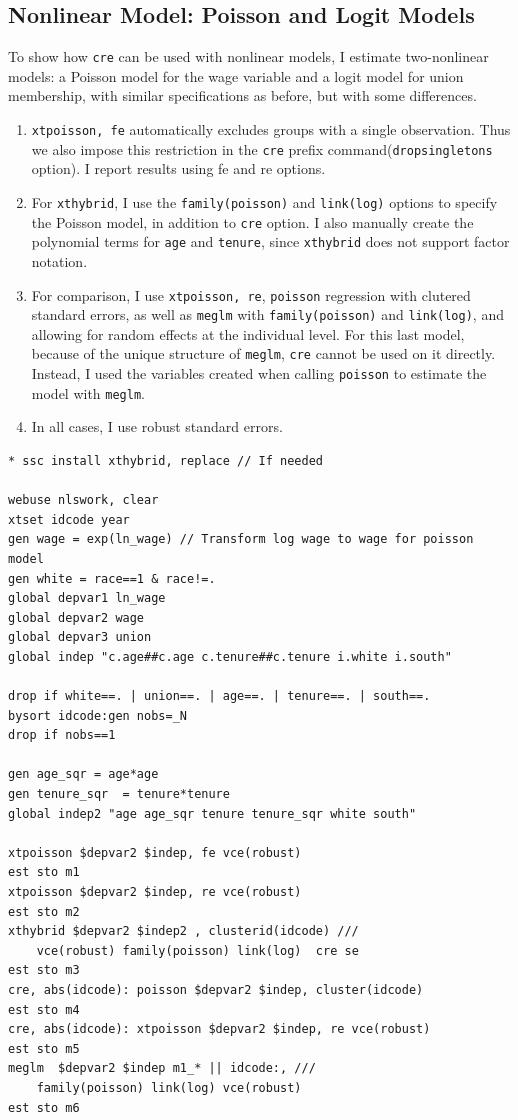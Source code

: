 \documentclass[bib]{statapress}
\providecommand{\tightlist}{%
  \setlength{\itemsep}{0pt}\setlength{\parskip}{0pt}}\usepackage{longtable,booktabs,array}
\begin{document}
\subsection{Nonlinear Model: Poisson and Logit
Models}\label{nonlinear-model-poisson-and-logit-models}

To show how \texttt{cre} can be used with nonlinear models, I estimate
two-nonlinear models: a Poisson model for the wage variable and a logit
model for union membership, with similar specifications as before, but
with some differences.

\begin{enumerate}
\def\labelenumi{\arabic{enumi}.}
\tightlist
\item
  \texttt{xtpoisson,\ fe} automatically excludes groups with a single
  observation. Thus we also impose this restriction in the \texttt{cre}
  prefix command(\texttt{dropsingletons} option). I report results using
  fe and re options.
\item
  For \texttt{xthybrid}, I use the \texttt{family(poisson)} and
  \texttt{link(log)} options to specify the Poisson model, in addition
  to \texttt{cre} option. I also manually create the polynomial terms
  for \texttt{age} and \texttt{tenure}, since \texttt{xthybrid} does not
  support factor notation.
\item
  For comparison, I use \texttt{xtpoisson,\ re}, \texttt{poisson}
  regression with clutered standard errors, as well as \texttt{meglm}
  with \texttt{family(poisson)} and \texttt{link(log)}, and allowing for
  random effects at the individual level. For this last model, because
  of the unique structure of \texttt{meglm}, \texttt{cre} cannot be used
  on it directly. Instead, I used the variables created when calling
  \texttt{poisson} to estimate the model with \texttt{meglm}.
\item
  In all cases, I use robust standard errors.
\end{enumerate}

\begin{verbatim}
* ssc install xthybrid, replace // If needed

webuse nlswork, clear
xtset idcode year
gen wage = exp(ln_wage) // Transform log wage to wage for poisson model
gen white = race==1 & race!=.
global depvar1 ln_wage
global depvar2 wage
global depvar3 union
global indep "c.age##c.age c.tenure##c.tenure i.white i.south"

drop if white==. | union==. | age==. | tenure==. | south==.
bysort idcode:gen nobs=_N
drop if nobs==1

gen age_sqr = age*age
gen tenure_sqr  = tenure*tenure
global indep2 "age age_sqr tenure tenure_sqr white south"

xtpoisson $depvar2 $indep, fe vce(robust)
est sto m1
xtpoisson $depvar2 $indep, re vce(robust)
est sto m2
xthybrid $depvar2 $indep2 , clusterid(idcode) ///
    vce(robust) family(poisson) link(log)  cre se
est sto m3
cre, abs(idcode): poisson $depvar2 $indep, cluster(idcode)
est sto m4
cre, abs(idcode): xtpoisson $depvar2 $indep, re vce(robust)
est sto m5
meglm  $depvar2 $indep m1_* || idcode:, ///
    family(poisson) link(log) vce(robust)
est sto m6
\end{verbatim}
\end{document}
